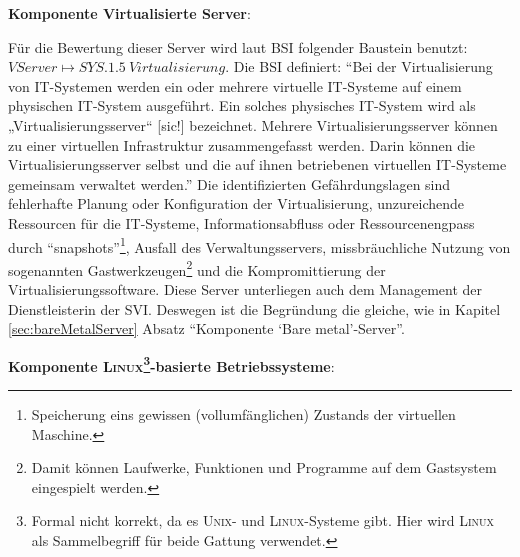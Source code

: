 \par
\textbf{Komponente Virtualisierte Server}:
\par
Für die Bewertung dieser Server wird laut \ac{BSI} folgender Baustein benutzt: $VServer \mapsto SYS.1.5\ Virtualisierung$. Die \ac{BSI} definiert: \enquote{Bei der Virtualisierung von IT-Systemen werden ein oder mehrere virtuelle IT-Systeme auf einem physischen IT-System ausgeführt. Ein solches physisches IT-System wird als „Virtualisierungsserver“ [sic!] bezeichnet. Mehrere Virtualisierungsserver können zu einer virtuellen Infrastruktur zusammengefasst werden. Darin können die Virtualisierungsserver selbst und die auf ihnen betriebenen virtuellen IT-Systeme gemeinsam verwaltet werden.}\autocite[][S.\,485]{bundesamt_fur_sicherheit_in_der_informationstechnik_bsi_it-grundschutz-kompendium_2020} Die identifizierten Gefährdungslagen sind fehlerhafte Planung oder Konfiguration der Virtualisierung, unzureichende Ressourcen für die IT-Systeme, Informationsabfluss oder Ressourcenengpass durch \enquote{snapshots}\footnote{Speicherung eins gewissen (vollumfänglichen) Zustands der virtuellen Maschine.}, Ausfall des Verwaltungsservers, missbräuchliche Nutzung von sogenannten Gastwerkzeugen\footnote{Damit können Laufwerke, Funktionen und Programme auf dem Gastsystem eingespielt werden.} und die Kompromittierung der Virtualisierungssoftware.\autocite[vgl.][S.\,486-487]{bundesamt_fur_sicherheit_in_der_informationstechnik_bsi_it-grundschutz-kompendium_2020} Diese Server unterliegen auch dem Management der Dienstleisterin der \ac{SVI}. Deswegen ist die Begründung die gleiche, wie in Kapitel \vref{sec:bareMetalServer} Absatz \enquote{Komponente \enquote{Bare metal}-Server}. 
\par
\textbf{Komponente \textsc{Linux}\footnote{Formal nicht korrekt, da es \textsc{Unix}- und \textsc{Linux}-Systeme gibt. Hier wird \textsc{Linux} als Sammelbegriff für beide Gattung verwendet.}-basierte Betriebssysteme}:
\par

